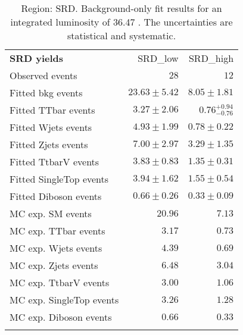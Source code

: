 

\begin{table}
\begin{center}
\setlength{\tabcolsep}{0.0pc}
{\small
\begin{tabular*}{\textwidth}{@{\extracolsep{\fill}}lrr}
\noalign{\smallskip}\hline\noalign{\smallskip}
{\bf SRD yields}           & SRD\_low            & SRD\_high              \\[-0.05cm]
\noalign{\smallskip}\hline\noalign{\smallskip}
Observed events          & $28$              & $12$                    \\
\noalign{\smallskip}\hline\noalign{\smallskip}
Fitted bkg events         & $23.63 \pm 5.42$          & $8.05 \pm 1.81$              \\
\noalign{\smallskip}\hline\noalign{\smallskip}
        Fitted TTbar events         & $3.27 \pm 2.06$          & $0.76_{-0.76}^{+0.94}$              \\
        Fitted Wjets events         & $4.93 \pm 1.99$          & $0.78 \pm 0.22$              \\
        Fitted Zjets events         & $7.00 \pm 2.97$          & $3.29 \pm 1.35$              \\
        Fitted TtbarV events         & $3.83 \pm 0.83$          & $1.35 \pm 0.31$              \\
        Fitted SingleTop events         & $3.94 \pm 1.62$          & $1.55 \pm 0.54$              \\
        Fitted Diboson events         & $0.66 \pm 0.26$          & $0.33 \pm 0.09$              \\
 \noalign{\smallskip}\hline\noalign{\smallskip}
MC exp. SM events              & $20.96$          & $7.13$              \\
\noalign{\smallskip}\hline\noalign{\smallskip}
        MC exp. TTbar events         & $3.17$          & $0.73$              \\
        MC exp. Wjets events         & $4.39$          & $0.69$              \\
        MC exp. Zjets events         & $6.48$          & $3.04$              \\
        MC exp. TtbarV events         & $3.00$          & $1.06$              \\
        MC exp. SingleTop events         & $3.26$          & $1.28$              \\
        MC exp. Diboson events         & $0.66$          & $0.33$              \\
\noalign{\smallskip}\hline\noalign{\smallskip}
\end{tabular*}
}
\end{center}
\caption{Region: SRD. Background-only fit results for an integrated luminosity of 36.47 \ifb. The uncertainties are statistical and systematic.
}
\label{table.bkgonly.SRD}
\end{table}
%